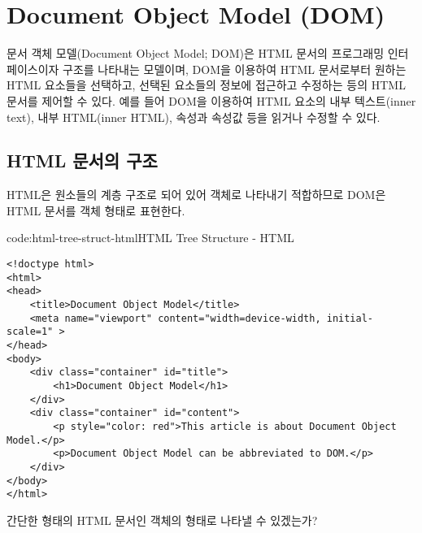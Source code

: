 \section{Document Object Model (DOM)} \label{sect:document-object-model}

문서 객체 모델(Document Object Model; DOM)은 HTML 문서의 프로그래밍 인터페이스이자 구조를 나타내는 모델이며, DOM을 이용하여 HTML 문서로부터 원하는 HTML 요소들을 선택하고, 선택된 요소들의 정보에 접근하고 수정하는 등의 HTML 문서를 제어할 수 있다. 예를 들어 DOM을 이용하여 HTML 요소의 내부 텍스트(inner text), 내부 HTML(inner HTML), 속성과 속성값 등을 읽거나 수정할 수 있다.

\subsection*{HTML 문서의 구조}

HTML은 원소들의 계층 구조로 되어 있어 객체로 나타내기 적합하므로 DOM은 HTML 문서를 객체 형태로 표현한다.

\begin{codeenv}{code:html-tree-struct-html}{HTML Tree Structure - HTML}\begin{verbatim}
<!doctype html>
<html>
<head>
    <title>Document Object Model</title>
    <meta name="viewport" content="width=device-width, initial-scale=1" >
</head>
<body>
    <div class="container" id="title">
        <h1>Document Object Model</h1>
    </div>
    <div class="container" id="content">
        <p style="color: red">This article is about Document Object Model.</p>
        <p>Document Object Model can be abbreviated to DOM.</p>
    </div>
</body>
</html>    
\end{verbatim}
\end{codeenv}

간단한 형태의 HTML 문서인 \을 객체의 형태로 나타낼 수 있겠는가?


